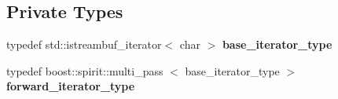 \subsection*{\-Private \-Types}
\begin{DoxyCompactItemize}
\item 
\hypertarget{classhttp__server_1_1cRequest_ab55878881ea0fad5b7801a7d3e67bc6f}{typedef \*
std\-::istreambuf\-\_\-iterator$<$ char $>$ {\bfseries base\-\_\-iterator\-\_\-type}}\label{classhttp__server_1_1cRequest_ab55878881ea0fad5b7801a7d3e67bc6f}

\item 
\hypertarget{classhttp__server_1_1cRequest_a4c4ef5da2042acec5d8f9ff9f0a432c3}{typedef \*
boost\-::spirit\-::multi\-\_\-pass\*
$<$ base\-\_\-iterator\-\_\-type $>$ {\bfseries forward\-\_\-iterator\-\_\-type}}\label{classhttp__server_1_1cRequest_a4c4ef5da2042acec5d8f9ff9f0a432c3}

\end{DoxyCompactItemize}
